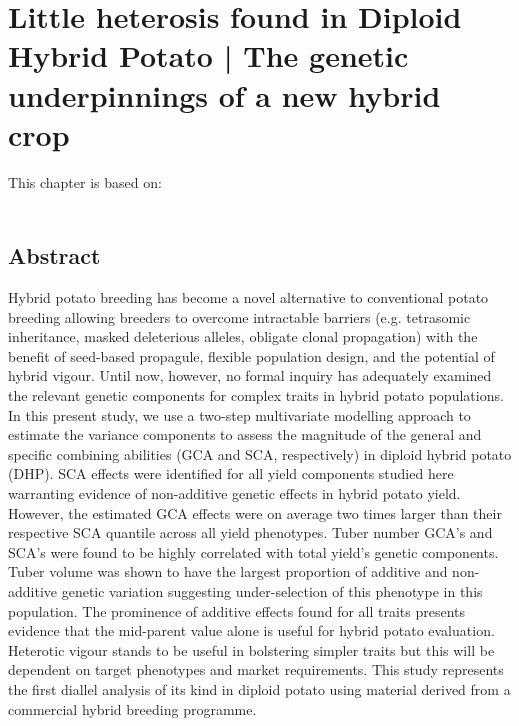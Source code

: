 \usepackage{bibentry}  %

\chapter[Little heterosis found in Diploid Hybrid Potato | The genetic underpinnings of a new hybrid crop]{Little heterosis found in Diploid Hybrid Potato | The genetic underpinnings of a new hybrid crop}


\label{cha:chapter2}
\vspace*{\fill}
This chapter is based on:
\\
\\
\newpage

\section*{Abstract}
 Hybrid potato breeding has become a novel alternative to conventional potato breeding allowing breeders to overcome intractable barriers (e.g. tetrasomic inheritance, masked deleterious alleles, obligate clonal propagation) with the benefit of seed-based propagule, flexible population design, and the potential of hybrid vigour. Until now, however, no formal inquiry has adequately examined the relevant genetic components for complex traits in hybrid potato populations. In this present study, we use a two-step multivariate modelling approach to estimate the variance components to assess the magnitude of the general and specific combining abilities (GCA and SCA, respectively) in diploid hybrid potato (DHP). SCA effects were identified for all yield components studied here warranting evidence of non-additive genetic effects in hybrid potato yield. However, the estimated GCA effects were on average two times larger than their respective SCA quantile across all yield phenotypes. Tuber number GCA’s and SCA’s were found to be highly correlated with total yield's genetic components. Tuber volume was shown to have the largest proportion of additive and non-additive genetic variation suggesting under-selection of this phenotype in this population. The prominence of additive effects found for all traits presents evidence that the mid-parent value alone is useful for hybrid potato evaluation. Heterotic vigour stands to be useful in bolstering simpler traits but this will be dependent on target phenotypes and market requirements. This study represents the first diallel analysis of its kind in diploid potato using material derived from a commercial hybrid breeding programme.

